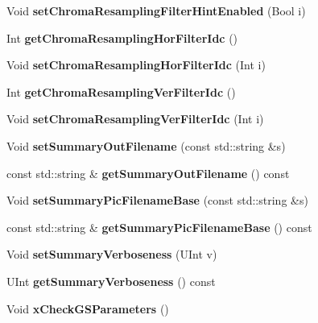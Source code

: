 \begin{DoxyCompactItemize}
Void {\bfseries set\+Chroma\+Resampling\+Filter\+Hint\+Enabled} (Bool i)
\item 
\mbox{\label{class_t_enc_cfg_a58c70cfcff7931147eca96957e65b4fb}} 
Int {\bfseries get\+Chroma\+Resampling\+Hor\+Filter\+Idc} ()
\item 
\mbox{\label{class_t_enc_cfg_aaa91d394b493dd55886d61903466db6b}} 
Void {\bfseries set\+Chroma\+Resampling\+Hor\+Filter\+Idc} (Int i)
\item 
\mbox{\label{class_t_enc_cfg_a0a2658d0ffea266fd5a1d6ac4ed8ad48}} 
Int {\bfseries get\+Chroma\+Resampling\+Ver\+Filter\+Idc} ()
\item 
\mbox{\label{class_t_enc_cfg_a3e19daed0f619c6886449c96a6122192}} 
Void {\bfseries set\+Chroma\+Resampling\+Ver\+Filter\+Idc} (Int i)
\item 
\mbox{\label{class_t_enc_cfg_a978ece3d767050ad91394aff97b907df}} 
Void {\bfseries set\+Summary\+Out\+Filename} (const std\+::string \&s)
\item 
\mbox{\label{class_t_enc_cfg_a50f720fa4e45c1c67a15bdaf97dd94f3}} 
const std\+::string \& {\bfseries get\+Summary\+Out\+Filename} () const
\item 
\mbox{\label{class_t_enc_cfg_ac84a2edb585baef4146039b290be6886}} 
Void {\bfseries set\+Summary\+Pic\+Filename\+Base} (const std\+::string \&s)
\item 
\mbox{\label{class_t_enc_cfg_ac847cf4f0c5a0e88a6a42b32694fd5d1}} 
const std\+::string \& {\bfseries get\+Summary\+Pic\+Filename\+Base} () const
\item 
\mbox{\label{class_t_enc_cfg_a7c357022450d764b0fee117fe394610f}} 
Void {\bfseries set\+Summary\+Verboseness} (U\+Int v)
\item 
\mbox{\label{class_t_enc_cfg_a2f3212ce141ed4b1fab7112b12aaa451}} 
U\+Int {\bfseries get\+Summary\+Verboseness} () const
\end{DoxyCompactItemize}
{\bf }\par
\begin{DoxyCompactItemize}
\item 
\mbox{\label{class_t_enc_cfg_a333dbbf8c6a174f9c5d0925697bb0e93}} 
Void {\bfseries x\+Check\+G\+S\+Parameters} ()
\end{DoxyCompactItemize}

